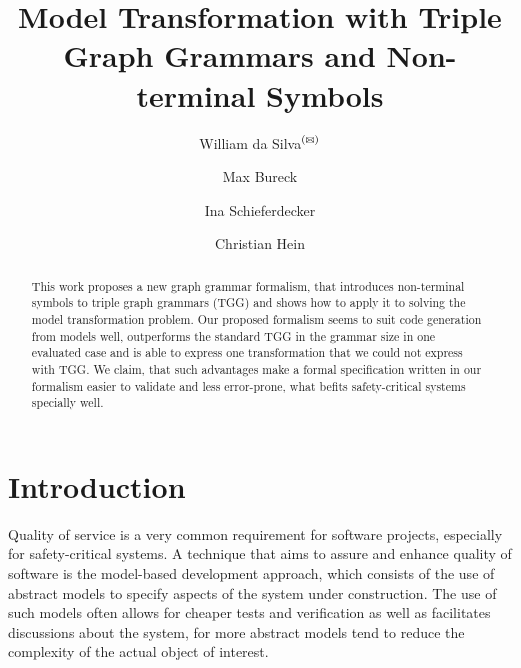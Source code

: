 \documentclass[runningheads]{llncs}
\begin{document}
%
\title{Model Transformation with Triple Graph Grammars and Non-terminal Symbols}
%
%
\author{William {da Silva}$^{(\text{\Letter})}$ \and
Max {Bureck} \and
Ina {Schieferdecker} \and
Christian {Hein}}
%
%
%
\maketitle              %
%
\begin{abstract}
This work proposes a new graph grammar formalism, that introduces non-terminal symbols to triple graph grammars (TGG) and shows how to apply it to solving the model transformation problem. Our proposed formalism seems to suit code generation from models well, outperforms the standard TGG in the grammar size in one evaluated case and is able to express one transformation that we could not express with TGG. We claim, that such advantages make a formal specification written in our formalism easier to validate and less error-prone, what befits safety-critical systems specially well.

\end{abstract}
%
%
%
\section{Introduction}
Quality of service is a very common requirement for software projects, especially for safety-critical systems. A technique that aims to assure and enhance quality of software is the model-based development approach, which consists of the use of abstract models to specify aspects of the system under construction. The use of such models often allows for cheaper tests and verification as well as facilitates discussions about the system, for more abstract models tend to reduce the complexity of the actual object of interest. 
\end{document}
